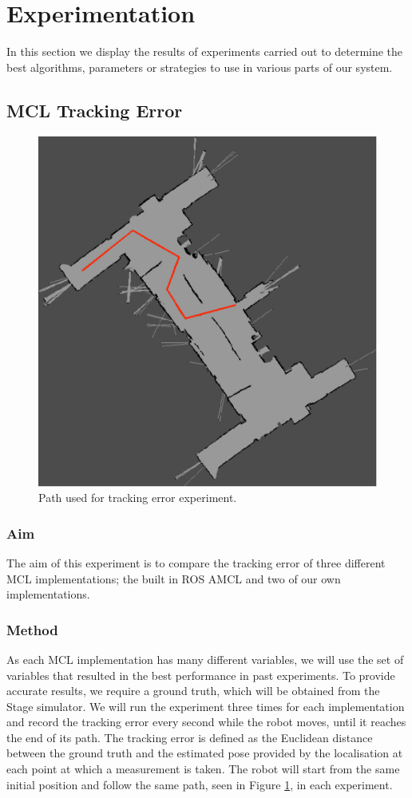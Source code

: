 \documentclass[conference]{IEEEtran}
\begin{document}
\section{Experimentation}
In this section we display the results of experiments carried out to determine the best algorithms, parameters or strategies to use in various parts of our system.
\subsection{MCL Tracking Error}
\begin{figure}
  \includegraphics[width=\columnwidth]{localisation-experiment-path}
  \caption{Path used for tracking error experiment.}
  \label{fig:locpath}
\end{figure}
\subsubsection{Aim}
The aim of this experiment is to compare the tracking error of three different MCL implementations; the built in ROS AMCL and two of our own implementations.
\subsubsection{Method}
As each MCL implementation has many different variables, we will use the set of variables that resulted in the best performance in past experiments. To provide accurate results, we require a ground truth, which will be obtained from the Stage simulator. We will run the experiment three times for each implementation and record the tracking error every second while the robot moves, until it reaches the end of its path. The tracking error is defined as the Euclidean distance between the ground truth and the estimated pose provided by the localisation at each point at which a measurement is taken. The robot will start from the same initial position and follow the same path, seen in Figure \ref{fig:locpath}, in each experiment.
\end{document}
